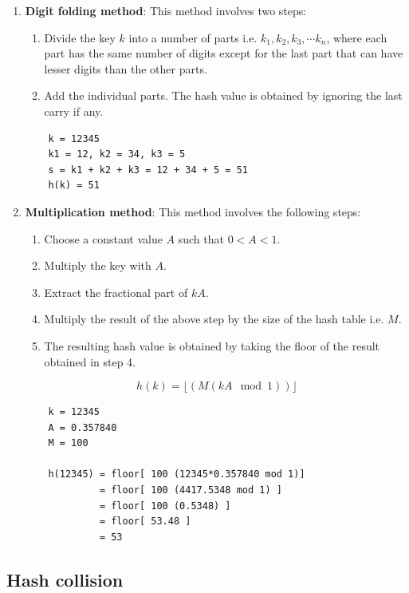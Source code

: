 \documentclass[a4paper,11pt]{book}
\begin{document}
\begin{enumerate}
    \item \textbf{Digit folding method}: This method involves two steps:
    \begin{enumerate}
        \item Divide the key $k$ into a number of parts i.e. $k_1, k_2, k_3,\cdots k_n$, where each part has the same number of digits except for the last part that can have lesser digits than the other parts.
        \item Add the individual parts. The hash value is obtained by ignoring the last carry if any.
    \end{enumerate}
    
    \begin{lstlisting}
    k = 12345
    k1 = 12, k2 = 34, k3 = 5
    s = k1 + k2 + k3 = 12 + 34 + 5 = 51 
    h(k) = 51
    \end{lstlisting}
    
    \item \textbf{Multiplication method}: This method involves the following steps:
    \begin{enumerate}
        \item Choose a constant value $A$ such that $0 < A < 1$.
        \item Multiply the key with $A$.
        \item Extract the fractional part of $kA$.
        \item Multiply the result of the above step by the size of the hash table i.e. $M$.
        \item The resulting hash value is obtained by taking the floor of the result obtained in step 4.
    \end{enumerate}
    $$h(k) = \lfloor (M (kA \mod 1))\rfloor$$
    \begin{lstlisting}
    k = 12345
    A = 0.357840
    M = 100
    
    h(12345) = floor[ 100 (12345*0.357840 mod 1)]
             = floor[ 100 (4417.5348 mod 1) ]
             = floor[ 100 (0.5348) ]
             = floor[ 53.48 ]
             = 53
    \end{lstlisting}
\end{enumerate}

\subsection{Hash collision}
\end{document}
